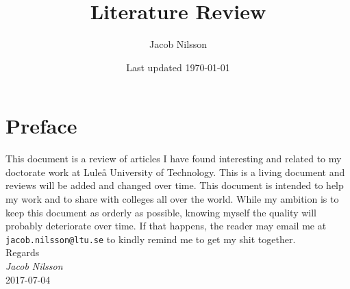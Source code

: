 \documentclass[10pt]{article}
\title{Literature Review}
\author{Jacob Nilsson}
\date{Last updated \today}
\begin{document}
 
\maketitle
\vfill
\centering
\begin{minipage}[p]{0.75\textwidth}

    \section*{\LARGE Preface}
        This document is a review of articles I have found interesting and related to my doctorate work at Luleå University of Technology.
        This is a living document and reviews will be added and changed over time.
        This document is intended to help my work and to share with colleges all over the world.
        While my ambition is to keep this document as orderly as possible, knowing myself the quality will probably deteriorate over time.
        If that happens, the reader may email me at \verb|jacob.nilsson@ltu.se| to kindly remind me to get my shit together.\\[1em]
        Regards\\[0.3em]\phantom{OO}\textit{Jacob Nilsson}\\\phantom{OO}\footnotesize 2017-07-04
    
\end{minipage}
\vfill
\newpage
\end{document}
